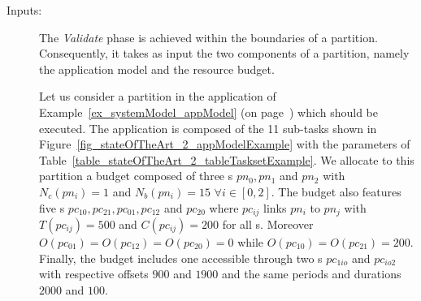\documentclass[main.tex]{subfiles}
\begin{document}
\begin{description}
    \item[Inputs: ]
        The \emph{Validate} phase is achieved within the boundaries of a partition. Consequently, it takes as input the two components of a partition, namely the application model and the resource budget.
        \begin{example}
            \label{ex_framework_exInputsValidation}
            Let us consider a partition in the application of Example~\ref{ex_systemModel_appModel} (on page~\pageref{ex_systemModel_appModel}) which should be executed. The application is composed of the 11 sub-tasks shown in Figure~\ref{fig_stateOfTheArt_2_appModelExample} with the parameters of Table~\ref{table_stateOfTheArt_2_tableTasksetExample}. 
            We allocate to this partition a budget composed of three \PN{}s $pn_0, pn_1 $ and $pn_2$ with $N_c(pn_i) = 1$ and $N_b(pn_i)=15$ $\forall i \in [0,2]$. The budget also features five \PC{}s $pc_{10}, pc_{21}, pc_{01}, pc_{12}$ and $pc_{20}$ where $pc_{ij}$ links $pn_i$ to $pn_j$ with $T(pc_{ij}) = 500$ and $C(pc_{ij}) = 200$ for all \PC{}s. Moreover $O(pc_{01}) = O(pc_{12}) = O(pc_{20}) = 0$ while $O(pc_{10}) = O(pc_{21}) = 200$. Finally, the budget includes one \ION{} accessible through two \PC{}s $pc_{1io}$ and $pc_{io2}$ with respective offsets $900$ and $1900$ and the same periods and durations $2000$ and $100$. 
        \end{example}


\end{description}
\end{document}
